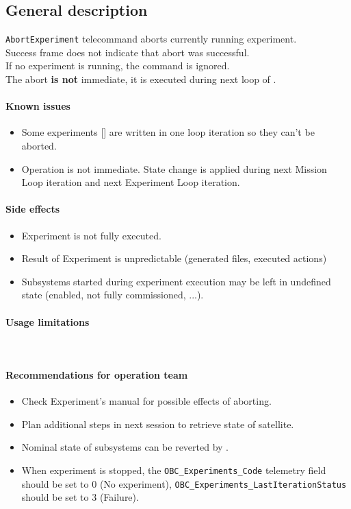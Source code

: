 

\subsection{General description}
\texttt{AbortExperiment} telecommand aborts currently running experiment.\\
Success frame does not indicate that abort was successful.\\
If no experiment is running, the command is ignored.\\
The abort \textbf{is not} immediate, it is executed during next loop of .

\paragraph{Known issues}
\begin{itemize}
	\item Some experiments [] are written in one loop iteration so they can't be aborted.
	\item Operation is not immediate. State change is applied during next Mission Loop iteration and next Experiment Loop iteration.
\end{itemize}

\paragraph{Side effects}
\begin{itemize}
	\item Experiment is not fully executed.
	\item Result of Experiment is unpredictable (generated files, executed actions)
	\item Subsystems started during experiment execution may be left in undefined state (enabled, not fully commissioned, ...).
\end{itemize}

\paragraph{Usage limitations}\mbox{}\\ 
\None

\paragraph{Recommendations for operation team}
\begin{itemize}
	\item Check Experiment's manual for possible effects of aborting.
	\item Plan additional steps in next session to retrieve state of satellite.
	\item Nominal state of subsystems can be reverted by .
	\item When experiment is stopped, the \texttt{OBC_Experiments_Code} telemetry field should be set to 0 (No experiment), \texttt{OBC_Experiments_LastIterationStatus} should be set to 3 (Failure).
\end{itemize}

